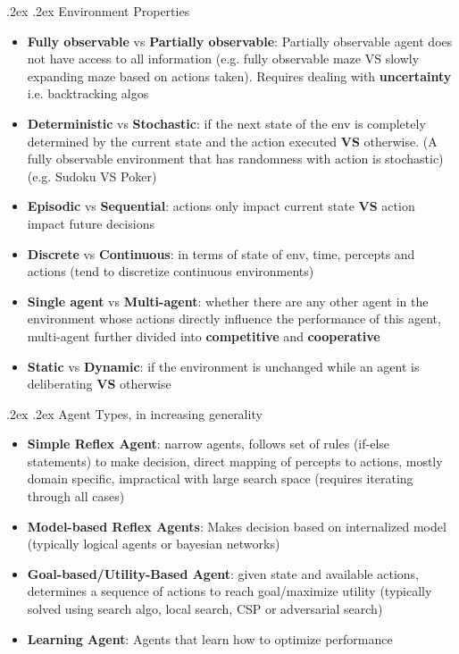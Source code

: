 \documentclass[10pt,landscape,a4paper]{article}
\makeatletter
\renewcommand{\subsection}{\@startsection{subsection}{1}{0mm}%
	{.2ex}%
	{.2ex}%
	{\sffamily\bfseries}}
\makeatother
\begin{document}
\begin{multicols*}{4}
  \subsection{Environment Properties}
  \begin{itemize}
    \item \textbf{Fully observable} vs \textbf{Partially observable}: Partially observable agent does not have access to all information (e.g. fully observable maze VS slowly expanding maze based on actions taken). Requires dealing with \textbf{uncertainty} i.e. backtracking algos 
    \item \textbf{Deterministic} vs \textbf{Stochastic}: if the next state of the env is completely determined by the current state and the action executed \textbf{VS} otherwise. (A fully observable environment that has randomness with action is stochastic) (e.g. Sudoku VS Poker)
    \item \textbf{Episodic} vs \textbf{Sequential}: actions only impact current state \textbf{VS} action impact future decisions
    \item \textbf{Discrete} vs \textbf{Continuous}: in terms of state of env, time, percepts and actions (tend to discretize continuous environments)
    \item \textbf{Single agent} vs \textbf{Multi-agent}: whether there are any other agent in the environment whose actions directly influence the performance of this agent, multi-agent further divided into \textbf{competitive} and \textbf{cooperative}
    \item \textbf{Static} vs \textbf{Dynamic}: if the environment is unchanged while an agent is deliberating \textbf{VS} otherwise
  \end{itemize}
  \subsection{Agent Types, in increasing generality}
  \begin{itemize}
    \item \textbf{Simple Reflex Agent}: narrow agents, follows set of rules (if-else statements) to make decision, direct mapping of percepts to actions, mostly domain specific, impractical with large search space (requires iterating through all cases)
    \item \textbf{Model-based Reflex Agents}: Makes decision based on internalized model (typically logical agents or bayesian networks)
    \item \textbf{Goal-based/Utility-Based Agent}: given state and available actions, determines a sequence of actions to reach goal/maximize utility (typically solved using search algo, local search, CSP or adversarial search)
    \item \textbf{Learning Agent}: Agents that learn how to optimize performance
  \end{itemize}


\end{multicols*}
\end{document}

